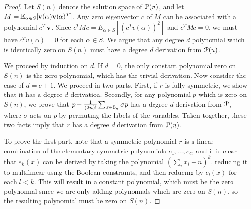 \documentclass[a4paper,UKenglish]{lipics-v2016}
\begin{document}
\begin{proof}
Let $S(n)$ denote the solution space of $\mathcal P(n)$, and let $M = \operatorname*{\mathbb{E}}_{\alpha \in S}[{\bf v}(\alpha){\bf v}(\alpha)^T]$. Any zero eigenvector $c$ of $M$ can be associated with a polynomial $c^T{\bf v}$. Since $c^TMc = E_{\alpha \in S}[(c^Tv(\alpha))^2]$ and $c^TMc = 0$, we must have $c^Tv(\alpha) = 0$ for each $\alpha \in S$. We argue that any degree $d$ polynomial which is identically zero on $S(n)$ must have a degree $d$ derivation from $\mathcal P(n)$. 

We proceed by induction on $d$. If $d = 0$, the only constant polynomial zero on $S(n)$ is the zero polynomial, which has the trivial derivation. Now consider the case of $d = c+1$. We proceed in two parts. First, if $r$ is fully symmetric, we show that it has a degree $d$ derivation. Secondly, for any polynomial $p$ which is zero on $S(n)$, we prove that $p - \frac{1}{(2n)!}\sum_{\sigma \in \mathcal S_n} \sigma p$ has a degree $d$ derivation from $\mathcal P$, where $\sigma$ acts on $p$ by permuting the labels of the variables. Taken together, these two facts imply that $r$ has a degree $d$ derivation from $\mathcal P(n)$.

To prove the first part, note that a symmetric polynomial $r$ is a linear combination of the elementary symmetric polynomials $e_1,\dots,e_c$, and it is clear that $e_k(x)$ can be derived by taking the polynomial $(\sum_i x_i - n)^k$, reducing it to multilinear using the Boolean constraints, and then reducing by $e_l(x)$ for each $l < k$. This will result in a constant polynomial, which must be the zero polynomial since we are only adding polynomials which are zero on $S(n)$, so the resulting polynomial must be zero on $S(n)$. 


\end{proof}
\end{document}
